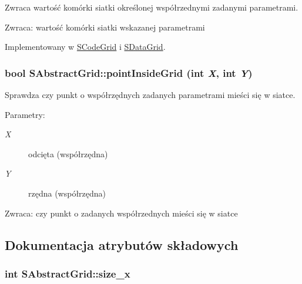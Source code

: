 Zwraca wartość komórki siatki określonej współrzednymi zadanymi parametrami. \begin{Desc}
\item[Zwraca:]wartość komórki siatki wskazanej parametrami \end{Desc}


Implementowany w \hyperlink{classSCodeGrid_c57d52a49a55c91068fe0eb541e721f8}{SCodeGrid} i \hyperlink{classSDataGrid_7f9dd63d74e36731875630a96ea8dd07}{SDataGrid}.\hypertarget{classSAbstractGrid_1e4823efb8b482d44466d8324f63dfb1}{
\subsubsection[{pointInsideGrid}]{\setlength{\rightskip}{0pt plus 5cm}bool SAbstractGrid::pointInsideGrid (int {\em X}, \/  int {\em Y})}}
\label{classSAbstractGrid_1e4823efb8b482d44466d8324f63dfb1}


Sprawdza czy punkt o współrzędnych zadanych parametrami mieści się w siatce. \begin{Desc}
\item[Parametry:]
\begin{description}
\item[{\em X}]odcięta (współrzędna) \item[{\em Y}]rzędna (współrzędna) \end{description}
\end{Desc}
\begin{Desc}
\item[Zwraca:]czy punkt o zadanych współrzednych mieści się w siatce \end{Desc}


\subsection{Dokumentacja atrybutów składowych}
\hypertarget{classSAbstractGrid_f0b1916fda47bbd921fc1b5b5abadb72}{
\subsubsection[{size\_\-x}]{\setlength{\rightskip}{0pt plus 5cm}int {\bf SAbstractGrid::size\_\-x}}}
\label{classSAbstractGrid_f0b1916fda47bbd921fc1b5b5abadb72}


